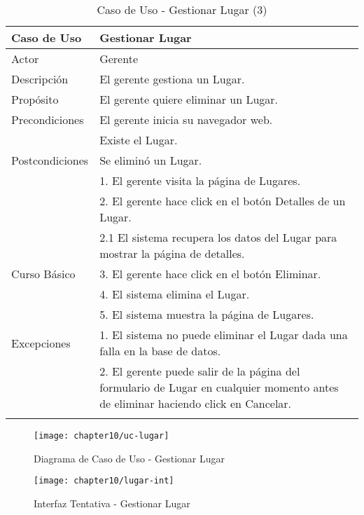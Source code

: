 \begin{longtable}{@{} p{3cm} p{10cm} @{}} \toprule
    \textbf{Caso de Uso}    & Gestionar Lugar \\ \midrule
    Actor                   & Gerente \\ \cmidrule{1-2}
    Descripción             & El gerente gestiona un Lugar. \\ \cmidrule{1-2}
    Propósito               & El gerente quiere eliminar un Lugar. \\ \cmidrule{1-2}
    Precondiciones          & El gerente inicia su navegador web. \\
                            & Existe el Lugar. \\ \cmidrule{1-2} 
    Postcondiciones         & Se eliminó un Lugar. \\ \cmidrule{1-2} 
                            & 1. El gerente visita la página de Lugares. \\ 
                            & 2. El gerente hace click en el botón Detalles de un Lugar. \\
                            & 2.1 El sistema recupera los datos del Lugar para mostrar la página de detalles. \\
    Curso Básico            & 3. El gerente hace click en el botón Eliminar. \\
                            & 4. El sistema elimina el Lugar. \\ 
                            & 5. El sistema muestra la página de Lugares. \\ \cmidrule{1-2}
    Excepciones             & 1. El sistema no puede eliminar el Lugar dada una falla en la base de datos. \\
                            & 2. El gerente puede salir de la página del formulario de Lugar en cualquier momento antes de eliminar haciendo click en Cancelar. \\ \bottomrule
   \caption{Caso de Uso - Gestionar Lugar (3)} \label{tab:tabcu-lug3} \\
   \end{longtable}

    \begin{figure}[H]
        \centering
        \texttt{[image: chapter10/uc-lugar]}
        \caption{Diagrama de Caso de Uso - Gestionar Lugar}
        \label{fig:lugar-uc}
    \end{figure}
    
    \begin{figure}[H]
        \centering
        \texttt{[image: chapter10/lugar-int]}
        \caption{Interfaz Tentativa - Gestionar Lugar}
        \label{fig:lugar-int}
    \end{figure}
    
